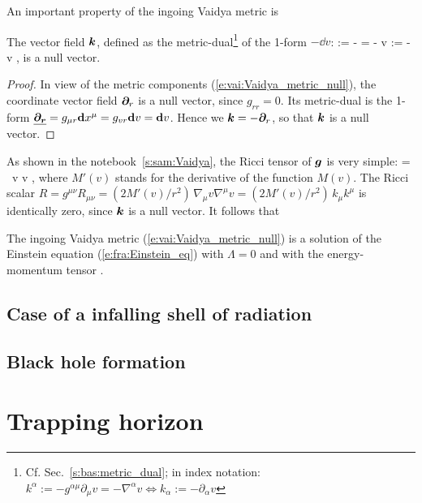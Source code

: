 An important property of the ingoing Vaidya metric is
\begin{greybox}
The vector field $\bm{k}$, defined as the metric-dual\footnote{Cf. Sec.~\ref{s:bas:metric_dual};
in index notation: $k^\alpha := - g^{\alpha\mu} \partial_\mu v = - \nabla^\alpha v \iff
k_\alpha := - \partial_\alpha v $}
of the 1-form $-\dd v$:
\be
     := -  = - \vw{\nabla} v \quad\iff\quad
     := - \dd v ,
\ee
is a null vector.
\end{greybox}
\begin{proof}
In view of the metric components (\ref{e:vai:Vaidya_metric_null}),
the coordinate vector field $\bm{\partial}_r$ is a null vector, since $g_{rr} = 0$.
Its metric-dual is the 1-form $\underline{\bm{\bm{\partial}_r}} = g_{\mu r}\mathbf{d} x^\mu = g_{vr} \mathbf{d} v = \mathbf{d} v$.
Hence we $\bm{k} = - \bm{\partial}_{r}$, so that $\bm{k}$ is a null vector.
\end{proof}

As shown in the notebook~\ref{s:sam:Vaidya},
the Ricci tensor of $\bm{g}$ is very simple:
\be
     = \, \dd v \otimes \dd v ,
\ee
where $M'(v)$ stands for the derivative of the function $M(v)$.
The Ricci scalar $R = g^{\mu\nu} R_{\mu\nu} = (2M'(v)/r^2) \, \nabla_\mu v \nabla^\mu v =  (2M'(v)/r^2) \, k_\mu k^\mu$ is identically zero, since $\bm{k}$ is a null vector.
It follows that
\begin{greybox}
The ingoing Vaidya metric (\ref{e:vai:Vaidya_metric_null}) is a solution
of the Einstein equation (\ref{e:fra:Einstein_eq})
with $\Lambda = 0$ and with the energy-momentum tensor
\be
    .
\ee
\end{greybox}

\subsection{Case of a infalling shell of radiation}

\subsection{Black hole formation}

\section{Trapping horizon}

